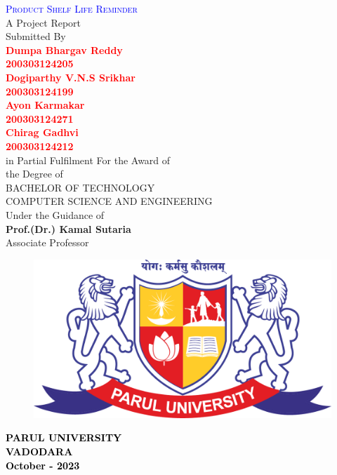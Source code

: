 \thispagestyle{empty}
\begin{center}
\textcolor{blue}{{\huge \textsc{Product Shelf Life Reminder} }}\\
\vspace{1cm}
A Project Report \\
\vspace{0.3cm}
Submitted By\\

\textcolor{red}{{\huge \bf Dumpa Bhargav Reddy} \\ {\bf 200303124205}}\\ 
\textcolor{red}{{\huge \bf Dogiparthy V.N.S Srikhar} \\ {\bf 200303124199}}\\ 
\textcolor{red}{{\huge \bf Ayon Karmakar} \\ {\bf 200303124271}}\\ 
\textcolor{red}{{\huge \bf Chirag Gadhvi} \\ {\bf 200303124212}}\\ 

\vspace{0.4cm}
in Partial Fulfilment For the Award of\\
the Degree of\\
BACHELOR OF TECHNOLOGY\\
COMPUTER SCIENCE AND ENGINEERING\\
Under the Guidance of\\
\large{\textbf{Prof.(Dr.) Kamal Sutaria}}\\
Associate Professor\\

\vspace{0.3cm}
\begin{figure}[h]
\begin{center}
     \includegraphics[scale=0.1]{parullogo.png}
\end{center}
\end{figure}
\textcolor{black}{\textbf{\large{PARUL UNIVERSITY}\\
VADODARA\\
October - 2023}}
\end{center}